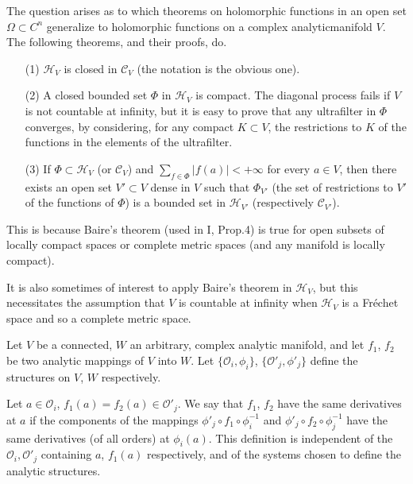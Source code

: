 The question arises as to which theorems on holomorphic functions in
an open set $\Omega \subset C^n$ generalize to holomorphic functions
on a complex analytic\pageoriginale manifold $V$. The following
theorems, and their proofs, do. 
\begin{itemize}
\item[(1)] $\mathscr{H}_V$ is closed in $\mathscr{C}_V$ (the notation
  is the obvious one).

\item[(2)] A closed bounded set $\Phi$ in $\mathscr{H}_V$ is
  compact. The diagonal process fails if $V$ is not countable at
  infinity, but it is easy to prove that any ultrafilter in $\Phi$
  converges, by considering, for any compact $K \subset V$, the
  restrictions to $K$ of the functions in the elements of the
  ultrafilter.

\item[(3)] If $\Phi \subset \mathscr{H}_V$ (or $\mathscr{C}_V$) and
  $\sum\limits_{f\in\Phi} |f(a)| < + \infty$ for every $a\in V$, then
  there exists an open set $V' \subset V$ dense in $V$ such that
  $\Phi_{V'}$ (the set of restrictions to $V'$ of the functions of
  $\Phi$) is a bounded set in $\mathscr{H}_{V'} $ (respectively
  $\mathscr{C}_{V'}$).
\end{itemize}

This is because Baire's theorem (used in I, Prop.4) is true for open
subsets of locally compact spaces or complete metric spaces (and any
manifold is locally compact).

It is also sometimes of interest to apply Baire's theorem in
$\mathscr{H}_V$, but this necessitates the assumption that $V$ is
countable at infinity when $\mathscr{H}_V$ is a Fr\'echet space and so
a complete metric space.

\medskip
{}

Let $V$ be a connected, $W$ an arbitrary, complex analytic manifold,
and let $f_1$, $f_2$ be two analytic mappings of $V$ into $W$. Let
$\{\mathscr{O}_i, \phi_i\}$, $\{\mathscr{O}'_j, \phi'_j\}$ define the
structures on $V$, $W$ respectively. 

Let $a \in \mathscr{O}_i$, $f_1(a) = f_2 (a) \in \mathscr{O}'_j$. We
say that $f_1$, $f_2$ have the same derivatives at $a$ if the
components of the mappings $\phi'_j \circ f_1 \circ \phi^{-1}_{i}$ and
$\phi'_j \circ f_2 \circ \phi^{-1}_j$ have the same derivatives (of
all orders) at $\phi_i(a)$. This definition is independent of the
$\mathscr{O}_i, \mathscr{O}'_j$ containing $a$, $f_1(a)$ respectively,
and of the systems chosen to define the analytic structures. 

